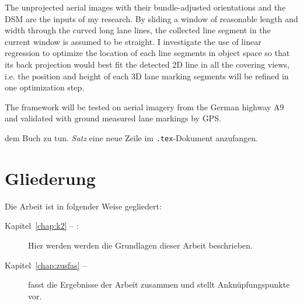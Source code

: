 The unprojected aerial images with their bundle-adjusted orientations and the DSM are the inputs of my research. By sliding a window of reasonable length and width through the curved long lane lines, the collected line segment in the current window is assumed to be straight. I investigate the use of linear regression to optimize the location of each line segments in object space so that its back projection would best fit the detected 2D line in all the covering views, i.e. the position and height of each 3D lane marking segments will be refined in one optimization step.

The framework will be tested on aerial imagery from the German highway A9 and validated with ground measured lane markings by GPS.


 dem Buch \cite{WSPA} zu tun.
\emph{Satz} eine neue Zeile im \texttt{.tex}-Dokument anzufangen.


\section*{Gliederung}
Die Arbeit ist in folgender Weise gegliedert:
\begin{description}
\item[Kapitel~\ref{chap:k2} -- :] Hier werden werden die Grundlagen dieser Arbeit beschrieben.
\item[Kapitel~\ref{chap:zusfas} -- ] fasst die Ergebnisse der Arbeit zusammen und stellt Anknüpfungspunkte vor.
\end{description}
